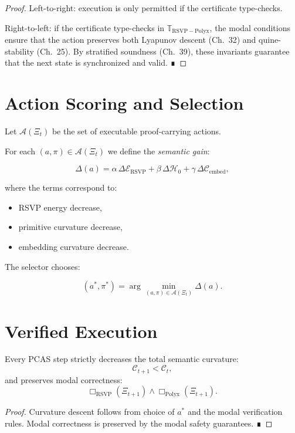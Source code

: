 \begin{proof}
Left-to-right: execution is only permitted if the certificate type-checks.

Right-to-left: if the certificate type-checks in
$\mathbb{T}_{\mathrm{RSVP-Polyx}}$, the modal conditions ensure that the action
preserves both Lyapunov descent (Ch.~32) and quine-stability (Ch.~25).  
By stratified soundness (Ch.~39), these invariants guarantee that the next
state is synchronized and valid. ∎
\end{proof}

\section{Action Scoring and Selection}

Let $\mathcal{A}(\Xi_t)$ be the set of executable proof-carrying actions.

For each $(a,\pi) \in \mathcal{A}(\Xi_t)$ we define the \emph{semantic gain}:

\[
\Delta(a)
=
\alpha\,
\Delta\mathcal{E}_{\mathrm{RSVP}}
+
\beta\,
\Delta\mathcal{H}_0
+
\gamma\,
\Delta\mathcal{C}_{\mathrm{embed}},
\]

where the terms correspond to:

\begin{itemize}
  \item RSVP energy decrease,
  \item primitive curvature decrease,
  \item embedding curvature decrease.
\end{itemize}

The selector chooses:

\[
(a^\ast,\pi^\ast)
=
\arg\min_{(a,\pi)\in\mathcal{A}(\Xi_t)} \Delta(a).
\]

\section{Verified Execution}

\begin{theorem}
Every PCAS step strictly decreases the total semantic curvature:
\[
\mathcal{C}_{t+1} < \mathcal{C}_t,
\]
and preserves modal correctness:
\[
\Box_{\mathrm{RSVP}}(\Xi_{t+1})
\wedge
\Box_{\mathrm{Polyx}}(\Xi_{t+1}).
\]
\end{theorem}

\begin{proof}
Curvature descent follows from choice of $a^\ast$ and the modal verification
rules.  
Modal correctness is preserved by the modal safety guarantees. ∎
\end{proof}

